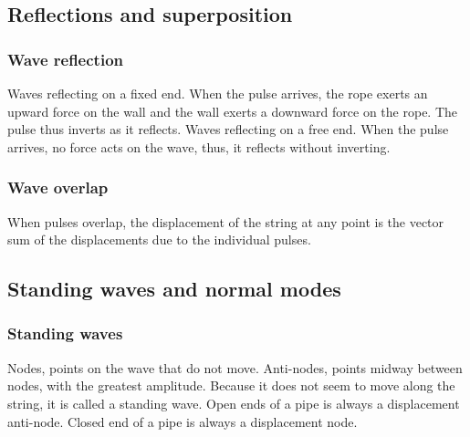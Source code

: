 \documentclass[a4paper]{article}
\begin{document}
\subsection{Reflections and superposition}
\subsubsection{Wave reflection}
Waves reflecting on a fixed end. When the pulse arrives, the rope exerts an upward force on the wall and the wall exerts a downward force on the rope. The pulse thus inverts as it reflects. \newline
Waves reflecting on a free end. When the pulse arrives, no force acts on the wave, thus, it reflects without inverting.
\subsubsection{Wave overlap}
When pulses overlap, the displacement of the string at any point is the vector sum of the displacements due to the individual pulses. 
\subsection{Standing waves and normal modes}
\subsubsection{Standing waves}
Nodes, points on the wave that do not move.
Anti-nodes, points midway between nodes, with the greatest amplitude. Because it does not seem to move along the string, it is called a standing wave.
\newline
Open ends of a pipe is always a displacement anti-node. Closed end of a pipe is always a displacement node.
\end{document}
